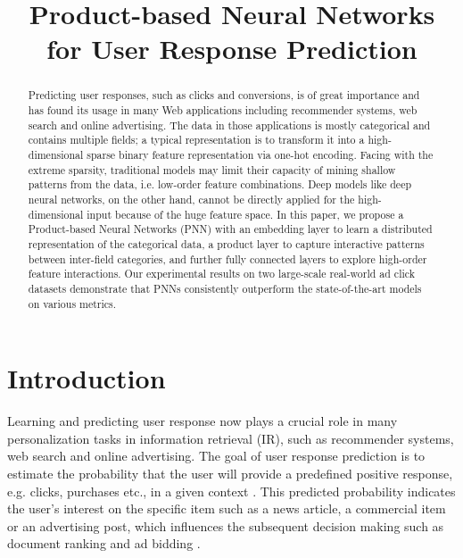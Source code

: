 \documentclass[conference]{IEEEtran}
\begin{document}
\title{Product-based Neural Networks for User Response Prediction}


\author{
\and
{}
}


\maketitle

\begin{abstract}
Predicting user responses, such as clicks and conversions, is of great importance and has found its usage in many Web applications including recommender systems, web search and online advertising. The data in those applications is mostly categorical and contains multiple fields; a typical representation is to transform it into a high-dimensional sparse binary feature representation via one-hot encoding.
Facing with the extreme sparsity, traditional models may limit their capacity of mining shallow patterns from the data, i.e. low-order feature combinations. Deep models like deep neural networks, on the other hand, cannot be directly applied for the high-dimensional input because of the huge feature space.
In this paper, we propose a Product-based Neural Networks (PNN) with an embedding layer to learn a distributed representation of the categorical data, a product layer to capture interactive patterns between inter-field categories, and further fully connected layers to explore high-order feature interactions.
Our experimental results on two large-scale real-world ad click datasets demonstrate that PNNs consistently outperform the state-of-the-art models on various metrics.
\end{abstract}







\IEEEpeerreviewmaketitle


\section{Introduction}\label{sec:intro}
Learning and predicting user response now plays a crucial role in many personalization tasks in information retrieval (IR), such as recommender systems, web search and online advertising. The goal of user response prediction is to estimate the probability that the user will provide a predefined positive response, e.g. clicks, purchases etc., in a given context
\cite{menon2011response}.
This predicted probability indicates the user's interest on the specific item such as a news article, a commercial item or an advertising post, which influences the subsequent decision making such as document ranking \cite{xue2004optimizing} and ad bidding \cite{zhang2014optimal}.
\end{document}
